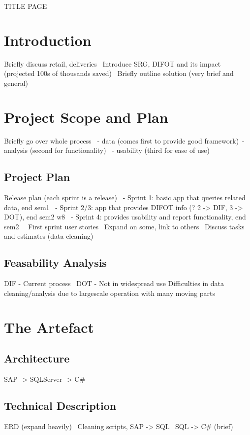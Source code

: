\documentclass[paper=a4]{article}
\begin{document}
TITLE PAGE

\pagebreak

\tableofcontents

\pagebreak
\section{Introduction}
Briefly discuss retail, deliveries \
Introduce SRG, DIFOT and its impact (projected 100s of thousands saved) \
Briefly outline solution (very brief and general)
\section{Project Scope and Plan}
Briefly go over whole process \
- data (comes first to provide good framework)\
- analysis (second for functionality) \
- usability (third for ease of use)

\subsection{Project Plan}
Release plan (each sprint is a release) \
- Sprint 1: basic app that queries related data, end sem1 \
- Sprint 2/3: app that provides DIFOT info (? 2 -> DIF, 3 -> DOT), end sem2 w8 \
- Sprint 4: provides usability and report functionality, end sem2\ 
\
First sprint user stories \
Expand on some, link to others \
Discuss tasks and estimates (data cleaning)

\subsection{Feasability Analysis}
DIF - Current process \
DOT - Not in widespread use
Difficulties in data cleaning/analysis due to largescale operation with many moving parts
\section{The Artefact}
\subsection{Architecture}
SAP -> SQLServer -> C\# \

\subsection{Technical Description}
ERD (expand heavily) \
Cleaning scripts, SAP -> SQL \
SQL -> C\# (brief)
\end{document}

